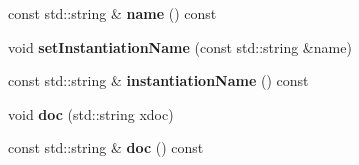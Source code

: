 \begin{DoxyCompactItemize}
\item 
\hypertarget{classcoco_1_1_service_a36b9922e26da16acc55cc239b29fb02a}{}const std\+::string \& {\bfseries name} () const \label{classcoco_1_1_service_a36b9922e26da16acc55cc239b29fb02a}

\item 
\hypertarget{classcoco_1_1_service_ab95d453640ed30f7dd6741a0d56e7495}{}void {\bfseries set\+Instantiation\+Name} (const std\+::string \&name)\label{classcoco_1_1_service_ab95d453640ed30f7dd6741a0d56e7495}

\item 
\hypertarget{classcoco_1_1_service_a2b420c54cd8f4673d5e9c9561ab8d945}{}const std\+::string \& {\bfseries instantiation\+Name} () const \label{classcoco_1_1_service_a2b420c54cd8f4673d5e9c9561ab8d945}

\item 
\hypertarget{classcoco_1_1_service_a6d2d09b40b6b37dcf0b234c11ec8147d}{}void {\bfseries doc} (std\+::string xdoc)\label{classcoco_1_1_service_a6d2d09b40b6b37dcf0b234c11ec8147d}

\item 
\hypertarget{classcoco_1_1_service_ab0c36a1d9bba3bb88cd9b7899e7db920}{}const std\+::string \& {\bfseries doc} () const \label{classcoco_1_1_service_ab0c36a1d9bba3bb88cd9b7899e7db920}

\end{DoxyCompactItemize}
